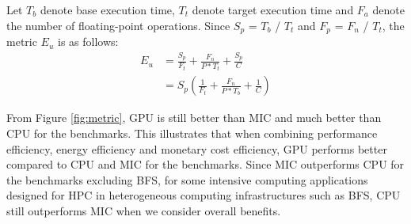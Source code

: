 Let $T_{b}$ denote base execution time, $T_{t}$ denote target execution time and $F_{a}$ denote the number of floating-point operations. Since $S_{p}$ = $T_{b}$ / $T_{t}$ and $F_{p}$ = $F_{n}$ / $T_{t}$, the metric $E_{u}$ is as follows:
  \begin{equation}\label{equ:metric1}
    \begin{split}
  {E_{u}} &  = \frac{S_{p}}{F_{t}}+\frac{F_{n}}{P*T_{t}}+\frac{S_{p}}{C} \\
   & = {S_{p}}(\frac{1}{F_{t}}+\frac{F_{n}}{P*T_{b}}+\frac{1}{C})
  \end{split}
\end{equation}

  
 From Figure \ref{fig:metric}, GPU is still better than MIC and much better than CPU for the benchmarks. This illustrates that when combining performance efficiency, energy efficiency and monetary cost efficiency, GPU performs better compared to CPU and MIC for the benchmarks. Since MIC outperforms CPU for the benchmarks excluding BFS, for some intensive computing applications designed for HPC in heterogeneous computing infrastructures such as BFS, CPU still outperforms MIC when we consider overall benefits.
